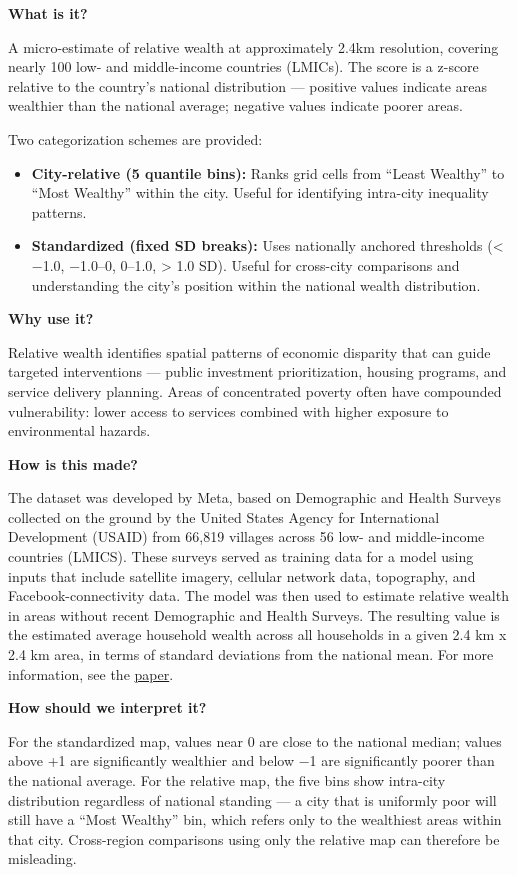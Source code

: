 \documentclass[
  letterpaper,
  DIV=11,
  numbers=noendperiod]{scrreprt}
\providecommand{\tightlist}{%
  \setlength{\itemsep}{0pt}\setlength{\parskip}{0pt}}
\begin{document}
\textbf{What is it?}

A micro-estimate of relative wealth at approximately 2.4km resolution,
covering nearly 100 low- and middle-income countries (LMICs). The score
is a z-score relative to the country's national distribution ---
positive values indicate areas wealthier than the national average;
negative values indicate poorer areas.

Two categorization schemes are provided:

\begin{itemize}
\tightlist
\item
  \textbf{City-relative (5 quantile bins):} Ranks grid cells from
  ``Least Wealthy'' to ``Most Wealthy'' within the city. Useful for
  identifying intra-city inequality patterns.
\item
  \textbf{Standardized (fixed SD breaks):} Uses nationally anchored
  thresholds (\textless{} −1.0, −1.0--0, 0--1.0, \textgreater{} 1.0 SD).
  Useful for cross-city comparisons and understanding the city's
  position within the national wealth distribution.
\end{itemize}

\textbf{Why use it?}

Relative wealth identifies spatial patterns of economic disparity that
can guide targeted interventions --- public investment prioritization,
housing programs, and service delivery planning. Areas of concentrated
poverty often have compounded vulnerability: lower access to services
combined with higher exposure to environmental hazards.

\textbf{How is this made?}

The dataset was developed by Meta, based on Demographic and Health
Surveys collected on the ground by the United States Agency for
International Development (USAID) from 66,819 villages across 56 low-
and middle-income countries (LMICS). These surveys served as training
data for a model using inputs that include satellite imagery, cellular
network data, topography, and Facebook-connectivity data. The model was
then used to estimate relative wealth in areas without recent
Demographic and Health Surveys. The resulting value is the estimated
average household wealth across all households in a given 2.4 km x 2.4
km area, in terms of standard deviations from the national mean. For
more information, see the
\href{https://www.pnas.org/doi/10.1073/pnas.2113658119?}{paper}.

\textbf{How should we interpret it?}

For the standardized map, values near 0 are close to the national
median; values above +1 are significantly wealthier and below −1 are
significantly poorer than the national average. For the relative map,
the five bins show intra-city distribution regardless of national
standing --- a city that is uniformly poor will still have a ``Most
Wealthy'' bin, which refers only to the wealthiest areas within that
city. Cross-region comparisons using only the relative map can therefore
be misleading.
\end{document}
